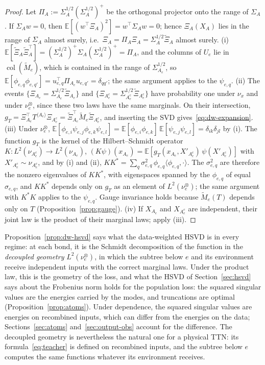 \documentclass[11pt]{article}
\newcommand{\E}{\mathbb{E}}
\newcommand{\col}{\operatorname{col}}
\theoremstyle{definition}
\numberwithin{equation}{section}
\begin{document}
\begin{proof}
Let $\Pi_A:=\Sigma_A^{1/2}(\Sigma_A^{1/2})^+$ be the orthogonal projector onto the range of $\Sigma_A$. If $\Sigma_Aw=0$, then $\E[(w^\top\Xi_A)^2]=w^\top\Sigma_Aw=0$; hence $\Xi_A(X_A)$ lies in the range of $\Sigma_A$ almost surely, i.e.\ $\Xi_A=\Pi_A\Xi_A=\Sigma_A^{1/2}\tilde\Xi_A$ almost surely. (i) $\E[\tilde\Xi_A\tilde\Xi_A^\top]=(\Sigma_A^{1/2})^+\Sigma_A(\Sigma_A^{1/2})^+=\Pi_A$, and the columns of $U_e$ lie in $\col(\tilde M_e)$, which is contained in the range of $\Sigma_{A_e}^{1/2}$, so $\E[\phi_{e,q}\phi_{e,q'}]=u^\top_{e,q}\Pi_{A_e}u_{e,q'}=\delta_{qq'}$; the same argument applies to the $\psi_{e,q}$. (ii) The events $\{\Xi_{A_e}=\Sigma_{A_e}^{1/2}\tilde\Xi_{A_e}\}$ and $\{\Xi_{A_e^c}=\Sigma_{A_e^c}^{1/2}\tilde\Xi_{A_e^c}\}$ have probability one under $\nu_x$ and under $\nu^\otimes_e$, since these two laws have the same marginals. On their intersection, $g_T=\Xi_{A_e}^\top T^{\langle A_e\rangle}\Xi_{A_e^c}=\tilde\Xi_{A_e}^\top\tilde M_e\tilde\Xi_{A_e^c}$, and inserting the SVD gives~\eqref{eq:dw-expansion}. (iii) Under $\nu^\otimes_e$, $\E[\phi_{e,i}\psi_{e,j}\phi_{e,k}\psi_{e,l}]=\E[\phi_{e,i}\phi_{e,k}]\,\E[\psi_{e,j}\psi_{e,l}]=\delta_{ik}\delta_{jl}$ by (i). The function $g_T$ is the kernel of the Hilbert--Schmidt operator $K:L^2(\nu_{A_e^c})\to L^2(\nu_{A_e})$, $(K\psi)(x_{A_e})=\E[g_T(x_{A_e},X'_{A_e^c})\,\psi(X'_{A_e^c})]$ with $X'_{A_e^c}\sim\nu_{A_e^c}$, and by (i) and (ii), $KK^*=\sum_q\sigma_{e,q}^2\,\phi_{e,q}\langle\phi_{e,q},\cdot\rangle$. The $\sigma_{e,q}^2$ are therefore the nonzero eigenvalues of $KK^*$, with eigenspaces spanned by the $\phi_{e,q}$ of equal $\sigma_{e,q}$, and $KK^*$ depends only on $g_T$ as an element of $L^2(\nu^\otimes_e)$; the same argument with $K^*K$ applies to the $\psi_{e,q}$. Gauge invariance holds because $\tilde M_e(T)$ depends only on $T$ (Proposition~\ref{prop:gauge}). (iv) If $X_{A_e}$ and $X_{A_e^c}$ are independent, their joint law is the product of their marginal laws; apply (iii).
\end{proof}

Proposition~\ref{prop:dw-hsvd} says what the data-weighted HSVD is in every regime: at each bond, it is the Schmidt decomposition of the function in the \emph{decoupled geometry} $L^2(\nu^\otimes_e)$, in which the subtree below $e$ and its environment receive independent inputs with the correct marginal laws. Under the product law, this is the geometry of the loss, and what the HSVD of Section~\ref{sec:hsvd} says about the Frobenius norm holds for the population loss: the squared singular values are the energies carried by the modes, and truncations are optimal (Proposition~\ref{prop:atoms}). Under dependence, the squared singular values are energies on recombined inputs, which can differ from the energies on the data; Sections~\ref{sec:atoms} and~\ref{sec:output-obs} account for the difference. The decoupled geometry is nevertheless the natural one for a physical TTN: its formula~\eqref{eq:teacher} is defined on recombined inputs, and the subtree below $e$ computes the same functions whatever its environment receives.
\end{document}
